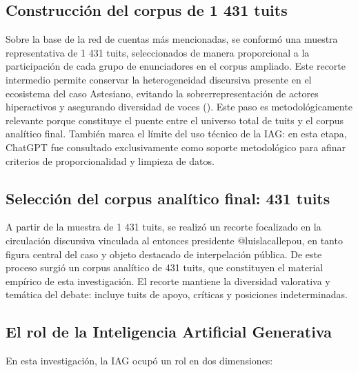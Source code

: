 \documentclass[spanish]{textolivre}
\begin{document}
\subsection{Construcción del corpus de 1 431 tuits}\label{sec-resumo}
Sobre la base de la red de cuentas más mencionadas, se conformó una muestra representativa de 1 431 tuits, seleccionados de manera proporcional a la participación de cada grupo de enunciadores en el corpus ampliado. Este recorte intermedio permite conservar la heterogeneidad discursiva presente en el ecosistema del caso Astesiano, evitando la sobrerrepresentación de actores hiperactivos y asegurando diversidad de voces (). Este paso es metodológicamente relevante porque constituye el puente entre el universo total de tuits y el corpus analítico final. También marca el límite del uso técnico de la IAG: en esta etapa, ChatGPT fue consultado exclusivamente como soporte metodológico para afinar criterios de proporcionalidad y limpieza de datos.

\subsection{Selección del corpus analítico final: 431 tuits}\label{sec-secoes}
A partir de la muestra de 1 431 tuits, se realizó un recorte focalizado en la circulación discursiva vinculada al entonces presidente @luislacallepou, en tanto figura central del caso y objeto destacado de interpelación pública. De este proceso surgió un corpus analítico de 431 tuits, que constituyen el material empírico de esta investigación. El recorte mantiene la diversidad valorativa y temática del debate: incluye tuits de apoyo, críticas y posiciones indeterminadas.

\subsection{El rol de la Inteligencia Artificial Generativa}\label{sec-format-simple}
En esta investigación, la IAG ocupó un rol en dos dimensiones:
\end{document}
